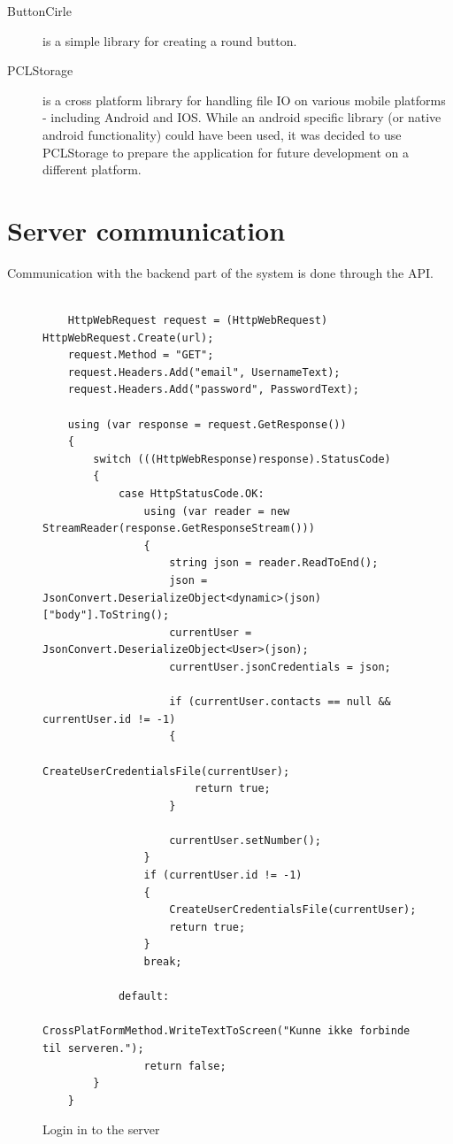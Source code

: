 \begin{description}
    \item [ButtonCirle] is a simple library for creating a round button.
    \item [PCLStorage] is a cross platform library for handling file IO on various mobile platforms - including Android and IOS. While an android specific library (or native android functionality) could have been used, it was decided to use PCLStorage to prepare the application for future development on a different platform.
\end{description}


\section{Server communication}
Communication with the backend part of the system is done through the API.

\begin{figure}[H]
    \centering
    \begin{lstlisting}

    HttpWebRequest request = (HttpWebRequest) HttpWebRequest.Create(url);
    request.Method = "GET";
    request.Headers.Add("email", UsernameText);
    request.Headers.Add("password", PasswordText);

    using (var response = request.GetResponse())
    {
        switch (((HttpWebResponse)response).StatusCode)
        {
            case HttpStatusCode.OK:
                using (var reader = new StreamReader(response.GetResponseStream()))
                {
                    string json = reader.ReadToEnd();
                    json = JsonConvert.DeserializeObject<dynamic>(json) ["body"].ToString();
                    currentUser = JsonConvert.DeserializeObject<User>(json);
                    currentUser.jsonCredentials = json;

                    if (currentUser.contacts == null && currentUser.id != -1)
                    {
                        CreateUserCredentialsFile(currentUser);
                        return true;
                    }

                    currentUser.setNumber();
                }
                if (currentUser.id != -1)
                {
                    CreateUserCredentialsFile(currentUser);
                    return true;
                }
                break;

            default:
                CrossPlatFormMethod.WriteTextToScreen("Kunne ikke forbinde til serveren.");
                return false;
        }
    }
\end{lstlisting}
    \caption{Login in to the server}
    \label{fig:appLogIn}
\end{figure}

